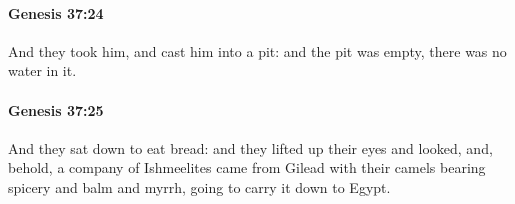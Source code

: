		\paragraph{Genesis 37:24} %
			\label{GENESIS-37-24}

			And they took him, and cast him into a pit: and the pit was empty, there was no water in it.


		\paragraph{Genesis 37:25} %
			\label{GENESIS-37-25}

			And they sat down to eat bread: and they lifted up their eyes and looked, and, behold, a company of Ishmeelites came from Gilead with their camels bearing spicery and balm and myrrh, going to carry it down to Egypt.


